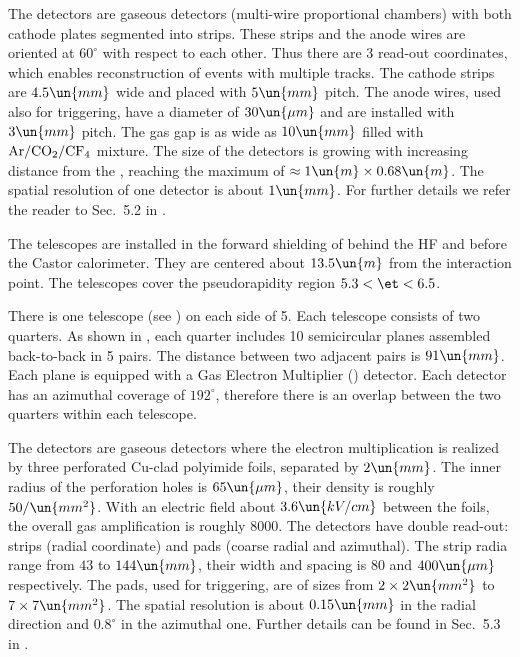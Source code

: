The  detectors are gaseous detectors (multi-wire proportional chambers) with both cathode plates segmented into strips. These strips and the anode wires are oriented at $60^\circ$ with respect to each other. Thus there are 3 read-out coordinates, which enables reconstruction of events with multiple tracks. The cathode strips are $4.5\un{mm}$ wide and placed with $5\un{mm}$ pitch. The anode wires, used also for triggering, have a diameter of $30\un{\mu m}$ and are installed with $3\un{mm}$ pitch. The gas gap is as wide as $10\un{mm}$ filled with $\rm Ar/CO_2/CF_4$ mixture. The size of the detectors is growing with increasing distance from the , reaching the maximum of $\approx 1\un{m} \times 0.68\un{m}$. The spatial resolution of one  detector is about $1\un{mm}$. For further details we refer the reader to Sec.~5.2 in .




The  telescopes are installed in the forward shielding of  behind the HF and before the Castor calorimeter. They are centered about $13.5\un{m}$ from the interaction point. The  telescopes cover the pseudorapidity region $5.3 < \et < 6.5$.

There is one telescope (see ) on each side of 5. Each telescope consists of two quarters. As shown in , each quarter includes 10 semicircular planes assembled back-to-back in 5 pairs. The distance between two adjacent pairs is $91\un{mm}$. Each plane is equipped with a Gas Electron Multiplier () detector. Each detector has an azimuthal coverage of $192^\circ$, therefore there is an overlap between the two quarters within each telescope.

The  detectors are gaseous detectors where the electron multiplication is realized by three perforated Cu-clad polyimide foils, separated by $2\un{mm}$. The inner radius of the perforation holes is $65\un{\mu m}$, their density is roughly $50/\un{mm^2}$. With an electric field about $3.6 \un{kV/cm}$ between the  foils, the overall gas amplification is roughly $8000$. The  detectors have double read-out: strips (radial coordinate) and pads (coarse radial and azimuthal). The strip radia range from $43$ to $144\un{mm}$, their width and spacing is $80$ and $400\un{\mu m}$ respectively. The pads, used for triggering, are of sizes from $2\times 2\un{mm^2}$ to $7\times 7\un{mm^2}$. The spatial resolution is about $0.15\un{mm}$ in the radial direction and $0.8^\circ$ in the azimuthal one. Further details can be found in Sec.~5.3 in .

